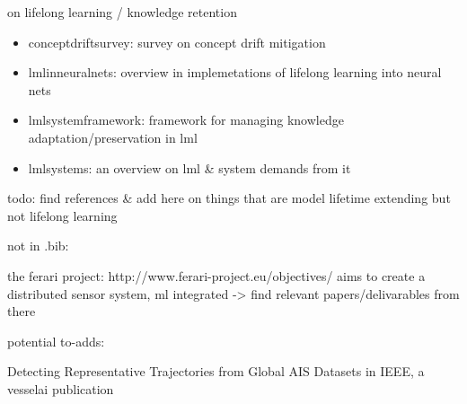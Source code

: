 \documentclass{article}
\begin{document}
on lifelong learning / knowledge retention
\begin{itemize}
    \item \cite{conceptdriftsurvey} conceptdriftsurvey: survey on concept drift mitigation
    \item \cite{lmlinneuralnets} lmlinneuralnets: overview in implemetations of lifelong learning into neural nets
    \item \cite{lmlsystemframework} lmlsystemframework: framework for managing knowledge adaptation/preservation in lml
    \item \cite{lmlsystems} lmlsystems: an overview on lml & system demands from it
\end{itemize}

todo: find references & add here on things that are model lifetime extending but not lifelong learning

not in .bib:

the ferari project: http://www.ferari-project.eu/objectives/ aims to create a distributed sensor system, ml integrated
-> find relevant papers/delivarables from there

potential to-adds:

Detecting Representative Trajectories from Global AIS Datasets in IEEE, a vesselai publication


\printbibliography
\end{document}
